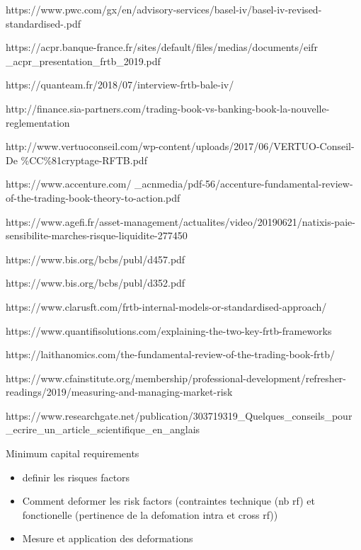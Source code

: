 \documentclass[3pt]{article}
\begin{document}
\bigskip 

\bigskip 

\bigskip
https://www.pwc.com/gx/en/advisory-services/basel-iv/basel-iv-revised-standardised-.pdf

https://acpr.banque-france.fr/sites/default/files/medias/documents/eifr%
\_acpr\_presentation\_frtb\_2019.pdf

https://quanteam.fr/2018/07/interview-frtb-bale-iv/

http://finance.sia-partners.com/trading-book-vs-banking-book-la-nouvelle-reglementation

http://www.vertuoconseil.com/wp-content/uploads/2017/06/VERTUO-Conseil-De%
\%CC\%81cryptage-RFTB.pdf

https://www.accenture.com/%
\_acnmedia/pdf-56/accenture-fundamental-review-of-the-trading-book-theory-to-action.pdf

https://www.agefi.fr/asset-management/actualites/video/20190621/natixis-paie-sensibilite-marches-risque-liquidite-277450

https://www.bis.org/bcbs/publ/d457.pdf

https://www.bis.org/bcbs/publ/d352.pdf

https://www.clarusft.com/frtb-internal-models-or-standardised-approach/

https://www.quantifisolutions.com/explaining-the-two-key-frtb-frameworks

https://laithanomics.com/the-fundamental-review-of-the-trading-book-frtb/

https://www.cfainstitute.org/membership/professional-development/refresher-readings/2019/measuring-and-managing-market-risk

https://www.researchgate.net/publication/303719319\_Quelques\_conseils\_pour%
\_ecrire\_un\_article\_scientifique\_en\_anglais

\bigskip 

\bigskip 

\bigskip Minimum capital requirements

\begin{itemize}
\item definir les risques factors

\item Comment deformer les risk factors (contraintes technique (nb rf) et
fonctionelle (pertinence de la defomation intra et cross rf))

\item Mesure et application des deformations
\end{itemize}
\end{document}
